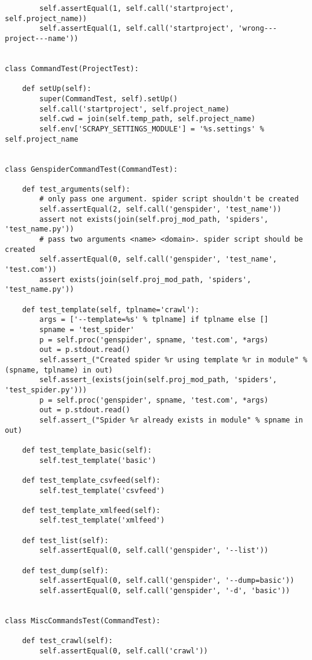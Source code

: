 \begin{lstlisting}
        self.assertEqual(1, self.call('startproject', self.project_name))
        self.assertEqual(1, self.call('startproject', 'wrong---project---name'))


class CommandTest(ProjectTest):

    def setUp(self):
        super(CommandTest, self).setUp()
        self.call('startproject', self.project_name)
        self.cwd = join(self.temp_path, self.project_name)
        self.env['SCRAPY_SETTINGS_MODULE'] = '%s.settings' % self.project_name


class GenspiderCommandTest(CommandTest):

    def test_arguments(self):
        # only pass one argument. spider script shouldn't be created
        self.assertEqual(2, self.call('genspider', 'test_name'))
        assert not exists(join(self.proj_mod_path, 'spiders', 'test_name.py'))
        # pass two arguments <name> <domain>. spider script should be created
        self.assertEqual(0, self.call('genspider', 'test_name', 'test.com'))
        assert exists(join(self.proj_mod_path, 'spiders', 'test_name.py'))

    def test_template(self, tplname='crawl'):
        args = ['--template=%s' % tplname] if tplname else []
        spname = 'test_spider'
        p = self.proc('genspider', spname, 'test.com', *args)
        out = p.stdout.read()
        self.assert_("Created spider %r using template %r in module" % (spname, tplname) in out)
        self.assert_(exists(join(self.proj_mod_path, 'spiders', 'test_spider.py')))
        p = self.proc('genspider', spname, 'test.com', *args)
        out = p.stdout.read()
        self.assert_("Spider %r already exists in module" % spname in out)

    def test_template_basic(self):
        self.test_template('basic')

    def test_template_csvfeed(self):
        self.test_template('csvfeed')

    def test_template_xmlfeed(self):
        self.test_template('xmlfeed')

    def test_list(self):
        self.assertEqual(0, self.call('genspider', '--list'))

    def test_dump(self):
        self.assertEqual(0, self.call('genspider', '--dump=basic'))
        self.assertEqual(0, self.call('genspider', '-d', 'basic'))


class MiscCommandsTest(CommandTest):

    def test_crawl(self):
        self.assertEqual(0, self.call('crawl'))


\end{lstlisting}
